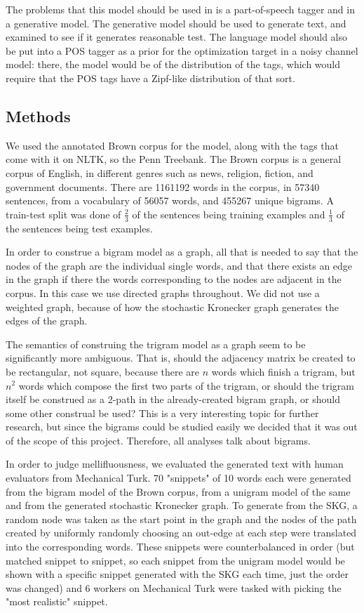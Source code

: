 \documentclass[12pt]{article}
\begin{document}
The problems that this model should be used in is a part-of-speech tagger and in a generative model. The generative model should be used to generate text, and examined to see if it generates reasonable test. The language model should also be put into a POS tagger as a prior for the optimization target in a noisy channel model: there, the model would be of the distribution of the tags, which would require that the POS tags have a Zipf-like distribution of that sort. \cite{collins}

\subsection{Methods}
We used the annotated Brown corpus for the model, along with the tags that come with it on NLTK, so the Penn Treebank. The Brown corpus is a general corpus of English, in different genres such as news, religion, fiction, and government documents. There are 1161192 words in the corpus, in 57340 sentences, from a vocabulary of 56057 words, and 455267 unique bigrams. A train-test split was done of $\frac{2}{3}$ of the sentences being training examples and $\frac{1}{3}$ of the sentences being test examples. %

In order to construe a bigram model as a graph, all that is needed to say that the nodes of the graph are the individual single words, and that there exists an edge in the graph if there the words corresponding to the nodes are adjacent in the corpus. In this case we use directed graphs throughout. We did not use a weighted graph, because of how the stochastic Kronecker graph generates the edges of the graph. %

The semantics of construing the trigram model as a graph seem to be significantly more ambiguous. That is, should the adjacency matrix be created to be rectangular, not square, because there are $n$ words which finish a trigram, but $n^2$ words which compose the first two parts of the trigram, or should the trigram itself be construed as a 2-path in the already-created bigram graph, or should some other construal be used? This is a very interesting topic for further research, but since the bigrams could be studied easily we decided that it was out of the scope of this project. Therefore, all analyses talk about bigrams.

In order to judge mellifluousness, we evaluated the generated text with human evaluators from Mechanical Turk. 70 "snippets" of 10 words each were generated from the bigram model of the Brown corpus, from a unigram model of the same and from the generated stochastic Kronecker graph. To generate from the SKG, a random node was taken as the start point in the graph and the nodes of the path created by uniformly randomly choosing an out-edge at each step were translated into the corresponding words. These snippets were counterbalanced in order (but matched snippet to snippet, so each snippet from the unigram model would be shown with a specific snippet generated with the SKG each time, just the order was changed) and 6 workers on Mechanical Turk were tasked with picking the "most realistic" snippet.
\end{document}
